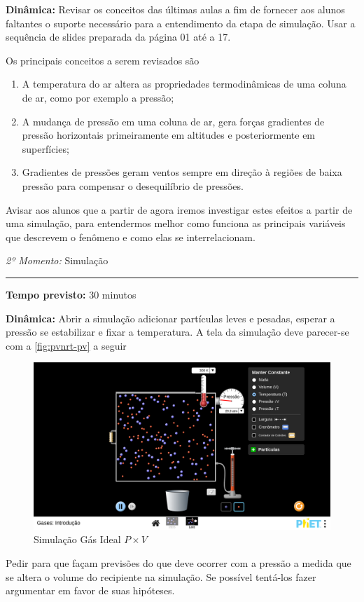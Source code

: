 \documentclass[
12pt,				%
openright,			%
oneside,			%
a4paper,			%
chapter=TITLE,		%
english,			%
brazil				%
]{abntex2}
\begin{document}
\noindent\textbf{Dinâmica:} Revisar os conceitos das últimas aulas a fim de fornecer aos alunos faltantes o suporte necessário para a entendimento da etapa de simulação. Usar a sequência de slides preparada da página 01 até a 17.

Os principais conceitos a serem revisados são
\begin{enumerate}[label=\alph *)]
	\item A temperatura do ar altera as propriedades termodinâmicas de uma coluna de ar, como por exemplo a pressão;
	\item A mudança de pressão em uma coluna de ar, gera forças gradientes de pressão horizontais primeiramente em altitudes e posteriormente em superfícies;
	\item Gradientes de pressões geram ventos sempre em direção à regiões de baixa pressão para compensar o desequilíbrio de pressões.
\end{enumerate}

Avisar aos alunos que a partir de agora iremos investigar estes efeitos a partir de uma simulação, para entendermos melhor como funciona as principais variáveis que descrevem o fenômeno e como elas se interrelacionam.
\vspace{50pt}
\par\noindent\emph{2º Momento:} Simulação
\par\noindent\rule{.3\textwidth}{.5pt}    
\par\noindent\textbf{Tempo previsto:} 30 minutos

\noindent\textbf{Dinâmica:} Abrir a simulação adicionar partículas leves e pesadas, esperar a pressão se estabilizar e fixar a temperatura. A tela da simulação deve parecer-se com a \autoref{fig:pvnrt-pv} a seguir
\setlength\intextsep{0pt}
\begin{figure}
	\centering
	\includegraphics[width=.5\textwidth]{img/pvnrt-pv.png}
	\caption{Simulação Gás Ideal $P \times V$}
	\label{fig:pvnrt-pv}
\end{figure}
Pedir para que façam previsões do que deve ocorrer com a pressão a medida que se altera o volume do recipiente na simulação. Se possível tentá-los fazer argumentar em favor de suas hipóteses.
\end{document}

